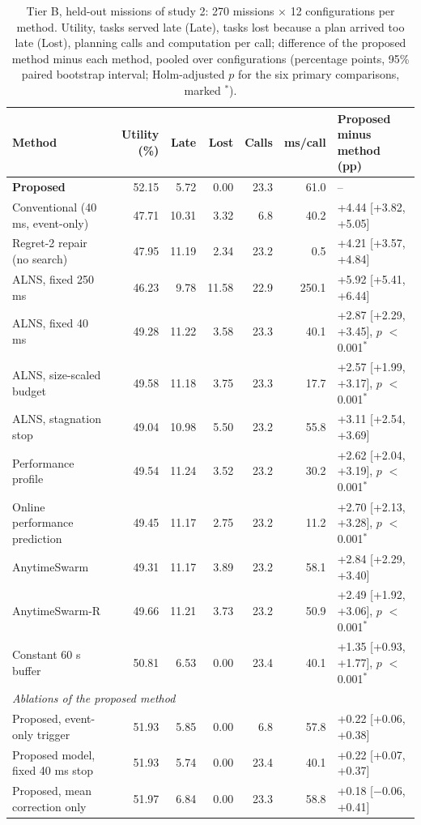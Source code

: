 \begin{table}[t]
\caption{Tier B, held-out missions of study 2: 270 missions $\times$ 12 configurations per method. Utility, tasks served late (Late), tasks lost because a plan arrived too late (Lost), planning calls and computation per call; difference of the proposed method minus each method, pooled over configurations (percentage points, 95\% paired bootstrap interval; Holm-adjusted $p$ for the six primary comparisons, marked $^{\ast}$).}\label{tab:s2main}
\centering\small
\setlength{\tabcolsep}{3pt}
\begin{tabular}{lrrrrrl}
\toprule
Method & Utility (\%) & Late & Lost & Calls & ms/call & Proposed minus method (pp) \\
\midrule
\textbf{Proposed} & 52.15 & 5.72 & 0.00 & 23.3 & 61.0 & -- \\
Conventional (40 ms, event-only) & 47.71 & 10.31 & 3.32 & 6.8 & 40.2 & +4.44 [+3.82, +5.05] \\
Regret-2 repair (no search) & 47.95 & 11.19 & 2.34 & 23.2 & 0.5 & +4.21 [+3.57, +4.84] \\
ALNS, fixed 250 ms~\cite{ropke2006adaptive} & 46.23 & 9.78 & 11.58 & 22.9 & 250.1 & +5.92 [+5.41, +6.44] \\
ALNS, fixed 40 ms~\cite{ropke2006adaptive} & 49.28 & 11.22 & 3.58 & 23.3 & 40.1 & +2.87 [+2.29, +3.45], $p$ $<$0.001$^{\ast}$ \\
ALNS, size-scaled budget & 49.58 & 11.18 & 3.75 & 23.3 & 17.7 & +2.57 [+1.99, +3.17], $p$ $<$0.001$^{\ast}$ \\
ALNS, stagnation stop & 49.04 & 10.98 & 5.50 & 23.2 & 55.8 & +3.11 [+2.54, +3.69] \\
Performance profile~\cite{boddy1994deliberation,zilberstein1996using} & 49.54 & 11.24 & 3.52 & 23.2 & 30.2 & +2.62 [+2.04, +3.19], $p$ $<$0.001$^{\ast}$ \\
Online performance prediction~\cite{svegliato2018meta} & 49.45 & 11.17 & 2.75 & 23.2 & 11.2 & +2.70 [+2.13, +3.28], $p$ $<$0.001$^{\ast}$ \\
AnytimeSwarm & 49.31 & 11.17 & 3.89 & 23.2 & 58.1 & +2.84 [+2.29, +3.40] \\
AnytimeSwarm-R & 49.66 & 11.21 & 3.73 & 23.2 & 50.9 & +2.49 [+1.92, +3.06], $p$ $<$0.001$^{\ast}$ \\
Constant 60 s buffer~\cite{agra2013robust} & 50.81 & 6.53 & 0.00 & 23.4 & 40.1 & +1.35 [+0.93, +1.77], $p$ $<$0.001$^{\ast}$ \\
\midrule
\multicolumn{7}{l}{\textit{Ablations of the proposed method}} \\
Proposed, event-only trigger & 51.93 & 5.85 & 0.00 & 6.8 & 57.8 & +0.22 [+0.06, +0.38] \\
Proposed model, fixed 40 ms stop & 51.93 & 5.74 & 0.00 & 23.4 & 40.1 & +0.22 [+0.07, +0.37] \\
Proposed, mean correction only & 51.97 & 6.84 & 0.00 & 23.3 & 58.8 & +0.18 [$-$0.06, +0.41] \\
\bottomrule
\end{tabular}
\end{table}
